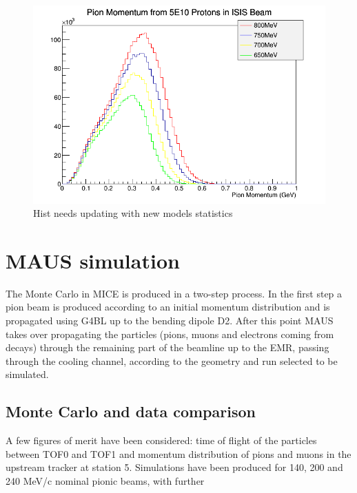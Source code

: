 \documentclass[a4paper,11pt]{article}
\begin{document}
\begin{figure}[t!]
  \begin{center}
    \includegraphics[width=1.0\columnwidth]{./figures/PiMomentum.png}
    \caption{Hist needs updating with new models statistics}
    \label{fig:PiMomentum}
  \end{center}
\end{figure}


\section{MAUS simulation}

The Monte Carlo in MICE is produced in a two-step process. In the first step a pion beam is produced according to an initial momentum distribution and is propagated using G4BL up to the bending dipole D2. After this point MAUS takes over propagating the particles (pions, muons and electrons coming from decays) through the remaining part of the beamline up to the EMR, passing through the cooling channel, according to the geometry and run selected to be simulated. 

\subsection{Monte Carlo and data comparison}

A few figures of merit have been considered: time of flight of the particles between TOF0 and TOF1 and momentum distribution of pions and muons in the upstream tracker at station 5.
Simulations have been produced for 140, 200 and 240 MeV/c nominal pionic beams, with further 
\end{document}
